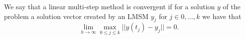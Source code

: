 %	
%	
	
	\begin{frame}
		\vfill
		\begin{definition}[Convergence] \label{def: LMSM convergence}
			We say that a linear multi-step method is convergent if for a solution $y$ of the problem a solution vector created by an LMSM $y_j$ for $j \in {0,...,k}$ we have that
			\begin{displaymath}
				\lim\limits_{h \to \infty} \max_{0 \leq j \leq k} ||y(t_j) - y_j|| = 0.
			\end{displaymath}
		\end{definition}
		\vfill
	\end{frame}
	
